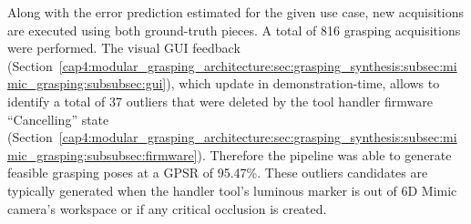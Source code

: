 \begin{table}[h!]
\end{table}


Along with the error prediction estimated for the given use case, new acquisitions are executed using both ground-truth pieces. A total of 816 grasping acquisitions were performed. The visual \ac{GUI} feedback (Section~\ref{cap4:modular_grasping_architecture:sec:grasping_synthesis:subsec:mimic_grasping:subsubsec:gui}), which update in demonstration-time, allows to identify  a total of 37 outliers that were deleted by the tool handler firmware ``Cancelling'' state (Section~\ref{cap4:modular_grasping_architecture:sec:grasping_synthesis:subsec:mimic_grasping:subsubsec:firmware}). Therefore the pipeline was able to generate feasible grasping poses at a \ac{GPSR} of 95.47\%. These outliers candidates are typically generated when the handler tool's luminous marker is out of 6D Mimic camera's workspace or if any critical occlusion is created. 


